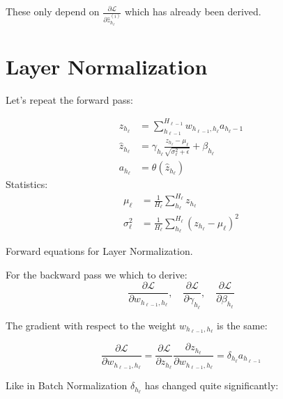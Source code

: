These only depend on $\frac{\partial \mathcal{L}}{\partial \hat{z}_{h_\ell}^{(i)}}$ which has already been derived.

\clearpage
\section{Layer Normalization}

Let's repeat the forward pass:
\begin{equationbox}[H]
\begin{equation*}
\begin{aligned}
z_{h_\ell} &= \sum_{h_{\ell-1}}^{H_{\ell-1}} w_{h_{\ell-1},h_\ell} a_{h_\ell-1} \\
\hat{z}_{h_\ell} &= \gamma_{h_\ell} \frac{z_{h_\ell} - \mu_{\ell}}{\sqrt{\sigma_{\ell}^2 + \epsilon}} + \beta_{h_\ell} \\
a_{h_\ell} &= \theta\left(\hat{z}_{h_\ell}\right)
\end{aligned}
\end{equation*}
Statistics:
\begin{equation*}
\begin{aligned}
\mu_{\ell} &= \frac{1}{H_\ell} \sum_{h_\ell}^{H_\ell} z_{h_\ell} \\
\sigma_{\ell}^2 &= \frac{1}{H_\ell} \sum_{h_\ell}^{H_\ell} (z_{h_\ell} - \mu_{\ell})^2
\end{aligned}
\end{equation*}
\caption{Forward equations for Layer Normalization.}
\end{equationbox}

For the backward pass we which to derive:
\begin{equation}
\frac{\partial \mathcal{L}}{\partial w_{h_{\ell-1},h_\ell}},\quad \frac{\partial \mathcal{L}}{\partial \gamma_{h_\ell}},\quad \frac{\partial \mathcal{L}}{\partial \beta_{h_\ell}}
\end{equation}

The gradient with respect to the weight $w_{h_{\ell-1},h_\ell}$ is the same:

\begin{equation}
\frac{\partial \mathcal{L}}{\partial w_{h_{\ell-1},h_\ell}} = \frac{\partial \mathcal{L}}{\partial z_{h_\ell}} \frac{\partial z_{h_\ell}}{\partial w_{h_{\ell-1},h_\ell}} = \delta_{h_\ell} a_{h_{\ell-1}}
\end{equation}

Like in Batch Normalization $\delta_{h_\ell}$ has changed quite significantly:

